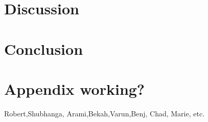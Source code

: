 \documentclass[draft,jgrga]{AGUTeX}
\begin{document}
\section{Discussion}\label{discussion}

\section{Conclusion}\label{conclusion}

\appendix
\section{Appendix working?}


\begin{acknowledgments}
Robert,Shubhanga, Arami,Bekah,Varun,Benj, Chad, Marie, etc.
\end{acknowledgments}






\end{document}
